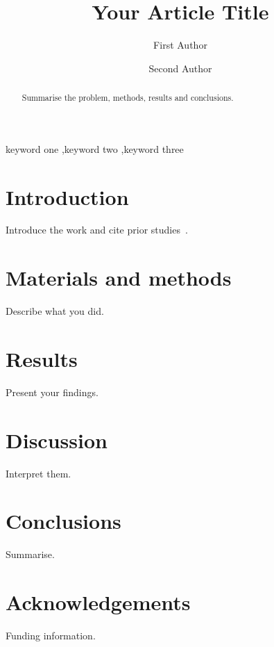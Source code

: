 \documentclass[preprint,12pt]{elsarticle}
\begin{document}
\begin{frontmatter}

\title{Your Article Title}

\author[inst1]{First Author}
\author[inst2]{Second Author}


\begin{abstract}
Summarise the problem, methods, results and conclusions.
\end{abstract}

\begin{keyword}
keyword one \sep keyword two \sep keyword three
\end{keyword}

\end{frontmatter}

\section{Introduction}
\label{sec:intro}
Introduce the work and cite prior studies~\cite{knuth1984}.

\section{Materials and methods}
Describe what you did.

\section{Results}
Present your findings.

\section{Discussion}
Interpret them.

\section{Conclusions}
Summarise.

\section*{Acknowledgements}
Funding information.



\end{document}
